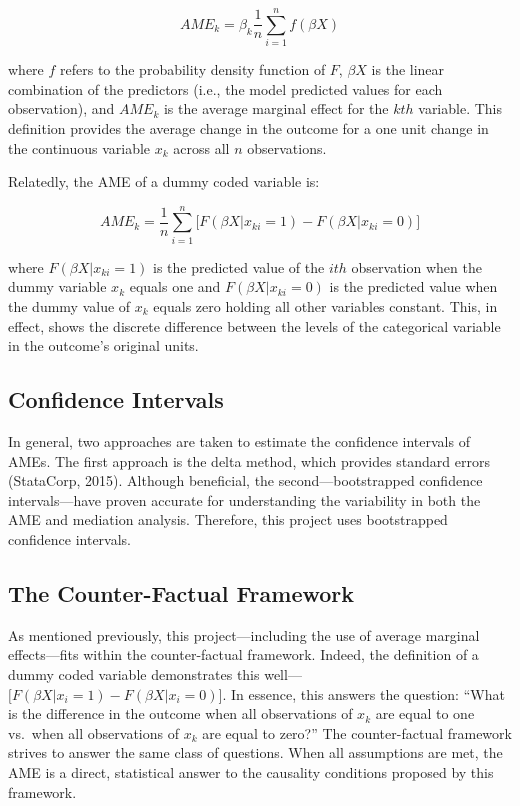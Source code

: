 \documentclass[]{DissertateUSU}
\begin{document}
\begin{equation}
AME_{k} = \beta_k \frac{1}{n} \sum_{i=1}^n f(\beta X)
\end{equation}

\noindent where \(f\) refers to the probability density function of
\(F\), \(\beta X\) is the linear combination of the predictors (i.e.,
the model predicted values for each observation), and \(AME_k\) is the
average marginal effect for the \(kth\) variable. This definition
provides the average change in the outcome for a one unit change in the
continuous variable \(x_k\) across all \(n\) observations.

Relatedly, the AME of a dummy coded variable is:

\begin{equation}
AME_{k} = \frac{1}{n} \sum_{i=1}^{n} \big[ F(\beta X | x_{ki} = 1) - F(\beta X | x_{ki} = 0) \big]
\end{equation}

\noindent where \(F(\beta X | x_{ki} = 1)\) is the predicted value of
the \(ith\) observation when the dummy variable \(x_k\) equals one and
\(F(\beta X | x_{ki} = 0)\) is the predicted value when the dummy value
of \(x_k\) equals zero holding all other variables constant. This, in
effect, shows the discrete difference between the levels of the
categorical variable in the outcome's original units.

\subsection{Confidence Intervals}\label{confidence-intervals}

In general, two approaches are taken to estimate the confidence
intervals of AMEs. The first approach is the delta method, which
provides standard errors (StataCorp, 2015). Although beneficial, the
second---bootstrapped confidence intervals---have proven accurate for
understanding the variability in both the AME and mediation analysis.
Therefore, this project uses bootstrapped confidence intervals.

\subsection{The Counter-Factual
Framework}\label{the-counter-factual-framework}

As mentioned previously, this project---including the use of average
marginal effects---fits within the counter-factual framework. Indeed,
the definition of a dummy coded variable demonstrates this
well---\(\big[ F(\beta X | x_i = 1) - F(\beta X | x_i = 0) \big]\). In
essence, this answers the question: ``What is the difference in the
outcome when all observations of \(x_k\) are equal to one vs.~when all
observations of \(x_k\) are equal to zero?'' The counter-factual
framework strives to answer the same class of questions. When all
assumptions are met, the AME is a direct, statistical answer to the
causality conditions proposed by this framework.
\end{document}

